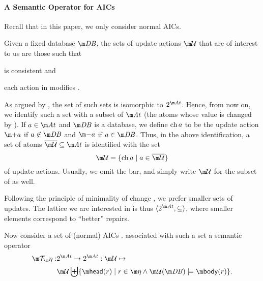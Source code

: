 \paragraph{A Semantic Operator for AICs}
Recall that in this paper, we only consider normal AICs.

Given a fixed database $\db$,
the sets of update actions $\UU$ that are of interest to us are those such that 
\begin{inparaenum}
\item \UU is consistent and 
\item each action in \UU modifies \db.
\end{inparaenum}
As argued by  \citet{iclp/Cruz-Filipe16}, the set of such sets is isomorphic to $2^{\atoms}$. Hence, from now on, we identify such a set with a subset of $\atoms$ (the atoms whose value is changed by \UU). 
If $a\in \atoms$ and $\db$ is a database, we define $\operatorname{ch} a$ to be the update action $\add a$ if $a\not\in \db$ and $\remove a$ if $a \in \db$. 
Thus, in the above identification, a set  of atoms $\overline\UU\subseteq \atoms$ is identified with the set 
\[\UU = \{\change a\mid a \in \overline \UU \}\]
of update actions.
Usually, we omit the bar, and simply write $\UU$ for the subset of \atoms as well.

Following the principle of minimality of change \cite{Winslett90,ai/EiterG92}, we prefer smaller sets of updates. %
The lattice we are interested in is thus $\langle 2^{\atoms}, \subseteq\rangle$, where  smaller elements correspond to ``better'' repairs. 


Now consider a set of (normal) AICs \aics. 
\citet{iclp/Cruz-Filipe16} associated with such a set a semantic operator
\begin{align*}\Op: &2^{\atoms}\to  2^{\atoms}: \UU \mapsto  \\ &\UU \biguplus \{\head(r) \mid r\in\aics \land  \UU(\db)\models \body(r)\}.\end{align*}

